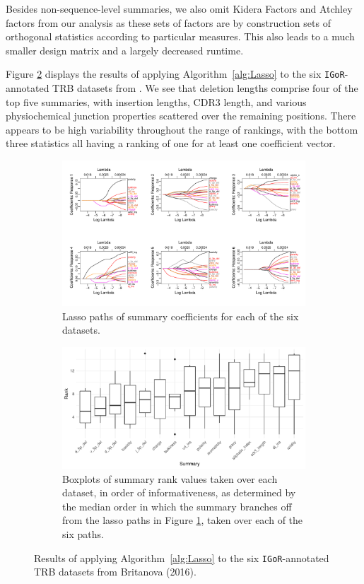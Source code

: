 \documentclass{article}
\newcommand{\igor}{\texttt{IGoR}}
\begin{document}
Besides non-sequence-level summaries, we also omit Kidera Factors and Atchley factors from our analysis as these sets of factors are by construction sets of orthogonal statistics according to particular measures.  
This also leads to a much smaller design matrix and a largely decreased runtime.

Figure \ref{fig:IgorLasso} displays the results of applying Algorithm~\ref{alg:Lasso} to the six \igor-annotated TRB datasets from \cite{Britanova2016-iw}.
We see that deletion lengths comprise four of the top five summaries, with insertion lengths, CDR3 length, and various physiochemical junction properties scattered over the remaining positions.
There appears to be high variability throughout the range of rankings, with the bottom three statistics all having a ranking of one for at least one coefficient vector.
\begin{figure}
    \begin{subfigure}{\linewidth}
    	\includegraphics[width=\linewidth]{Figures/Lasso/igor_lasso_paths.pdf}
		\caption{Lasso paths of summary coefficients for each of the six datasets.}
		\label{fig:IgorLassoPaths}
    \end{subfigure}
    \begin{subfigure}{\linewidth}
    	\includegraphics[width=\linewidth]{Figures/Lasso/igor_lasso_scores.pdf}
		\caption{Boxplots of summary rank values taken over each dataset, in order of informativeness, as determined by the median order in which the summary branches off from the lasso paths in Figure \ref{fig:IgorLassoPaths}, taken over each of the six paths.}
    \end{subfigure}
    \caption{Results of applying Algorithm~\ref{alg:Lasso} to the six \igor-annotated TRB datasets from Britanova (2016).}
    \label{fig:IgorLasso}
\end{figure}
\end{document}
